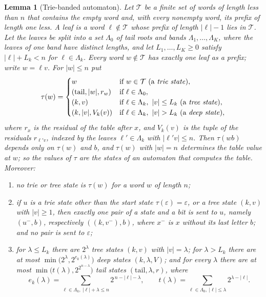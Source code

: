 \documentclass[11pt]{article}
\newtheorem{lemma}[theorem]{Lemma}
\theoremstyle{remark}
\begin{document}
\begin{lemma}[Trie-banded automaton]\label{lem:trieband}
Let $\mathcal T$ be a finite set of words of length less than $n$ that contains the empty
word and, with every nonempty word, its prefix of length one less.  A \emph{leaf} is a
word $\ell\notin\mathcal T$ whose prefix of length $|\ell|-1$ lies in $\mathcal T$.  Let
the leaves be split into a set $\Lambda_0$ of \emph{tail roots} and \emph{bands}
$\Lambda_1,\dots,\Lambda_K$, where the leaves of one band have distinct lengths, and let
$L_1,\dots,L_K\ge0$ satisfy $|\ell|+L_k<n$ for $\ell\in\Lambda_k$.  Every word
$w\notin\mathcal T$ has exactly one leaf as a prefix; write $w=\ell v$.  For $|w|\le n$ put
\[
 \tau(w)=\begin{cases}
 w & \text{if }w\in\mathcal T\ \text{(a \emph{trie state})},\\
 (\mathrm{tail},|w|,r_w) & \text{if }\ell\in\Lambda_0,\\
 (k,v) & \text{if }\ell\in\Lambda_k,\ |v|\le L_k\ \text{(a \emph{tree state})},\\
 (k,|v|,V_k(v)) & \text{if }\ell\in\Lambda_k,\ |v|>L_k\ \text{(a \emph{deep state})},
 \end{cases}
\]
where $r_x$ is the residual of the table after $x$, and $V_k(v)$ is the tuple of the
residuals $r_{\ell'v}$, indexed by the leaves $\ell'\in\Lambda_k$ with $|\ell'v|\le n$.
Then $\tau(wb)$ depends only on $\tau(w)$ and $b$, and $\tau(w)$ with $|w|=n$ determines
the table value at $w$; so the values of $\tau$ are the states of an automaton that
computes the table.  Moreover:
\begin{enumerate}
\item[(a)] no trie or tree state is $\tau(w)$ for a word $w$ of length $n$;
\item[(b)] if $u$ is a trie state other than the start state $\tau(\varepsilon)=\varepsilon$,
or a tree state $(k,v)$ with $|v|\ge1$, then exactly one pair of a state and a bit is sent
to $u$, namely $(u^-,b)$, respectively $((k,v^-),b)$, where $x^-$ is $x$ without its last
letter $b$; and no pair is sent to $\varepsilon$;
\item[(c)] for $\lambda\le L_k$ there are $2^\lambda$ tree states $(k,v)$ with
$|v|=\lambda$; for $\lambda>L_k$ there are at most $\min\bigl(2^\lambda,2^{e_k(\lambda)}\bigr)$
deep states $(k,\lambda,V)$; and for every $\lambda$ there are at most
$\min\bigl(t(\lambda),2^{2^{n-\lambda}}\bigr)$ tail states $(\mathrm{tail},\lambda,r)$, where
\[
 e_k(\lambda)=\sum_{\ell\in\Lambda_k,\ |\ell|+\lambda\le n}2^{\,n-|\ell|-\lambda},
 \qquad
 t(\lambda)=\sum_{\ell\in\Lambda_0,\ |\ell|\le\lambda}2^{\lambda-|\ell|}.
\]
\end{enumerate}
\end{lemma}
\end{document}
